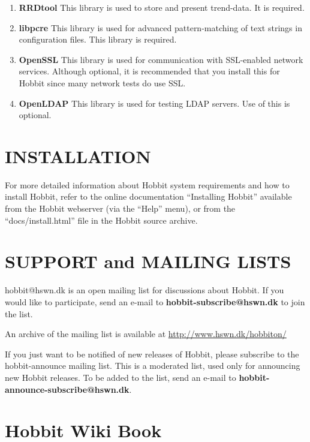 \begin{enumerate}

 \item \textbf{RRDtool}
 This library is used to store and present trend-data. It is required. 

 \item \textbf{libpcre}
 This library is used for advanced pattern-matching of text strings in
 configuration files. This library is required. 

 \item \textbf{OpenSSL}
 This library is used for communication with SSL-enabled network
 services. Although optional, it is recommended that you install this
 for Hobbit since many network tests do use SSL. 

 \item \textbf{OpenLDAP}
 This library is used for testing LDAP servers. Use of this is optional. 

\end{enumerate}

\section{INSTALLATION}
  For more detailed information about Hobbit system requirements and
  how to install Hobbit, refer to the online documentation
  ``Installing Hobbit'' available from the Hobbit webserver (via the
  ``Help'' menu), or from the ``docs/install.html'' file in the Hobbit
  source archive. 


\section{SUPPORT and MAILING LISTS}
hobbit@hswn.dk is an open mailing list for discussions about
Hobbit. If you would like to participate, send an e-mail to
\textbf{hobbit-subscribe@hswn.dk} to join the list. 


An archive of the mailing list is available at \url{http://www.hswn.dk/hobbiton/}


If you just want to be notified of new releases of Hobbit, please
subscribe to the hobbit-announce mailing list. This is a moderated
list, used only for announcing new Hobbit releases. To be added to
the list, send an e-mail to \textbf{hobbit-announce-subscribe@hswn.dk}. 

\section{Hobbit Wiki Book}

